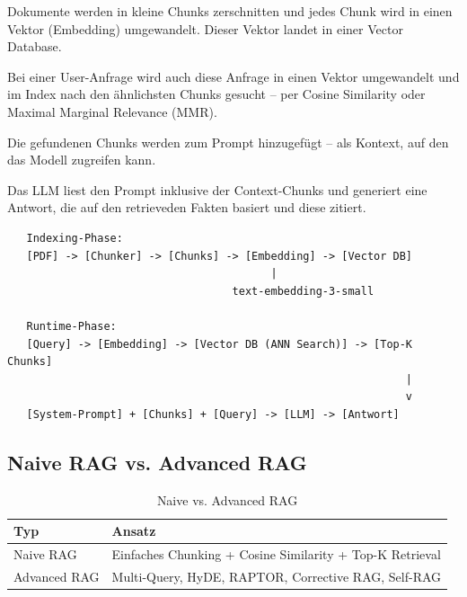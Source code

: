 \begin{description}[leftmargin=*,style=nextline]
    \item[Indexing (Indexierung):] Dokumente werden in kleine Chunks zerschnitten und jedes Chunk wird in einen Vektor (Embedding) umgewandelt. Dieser Vektor landet in einer Vector Database.
    \item[Retrieval (Abruf):] Bei einer User-Anfrage wird auch diese Anfrage in einen Vektor umgewandelt und im Index nach den ähnlichsten Chunks gesucht -- per Cosine Similarity oder Maximal Marginal Relevance (MMR).
    \item[Augmentation (Anreicherung):] Die gefundenen Chunks werden zum Prompt hinzugefügt -- als Kontext, auf den das Modell zugreifen kann.
    \item[Generation (Generierung):] Das LLM liest den Prompt inklusive der Context-Chunks und generiert eine Antwort, die auf den retrieveden Fakten basiert und diese zitiert.
\end{description}

\begin{verbatim}
   Indexing-Phase:
   [PDF] -> [Chunker] -> [Chunks] -> [Embedding] -> [Vector DB]
                                         |
                                   text-embedding-3-small
   
   Runtime-Phase:
   [Query] -> [Embedding] -> [Vector DB (ANN Search)] -> [Top-K Chunks]
                                                              |
                                                              v
   [System-Prompt] + [Chunks] + [Query] -> [LLM] -> [Antwort]
\end{verbatim}

\subsection{Naive RAG vs. Advanced RAG}

\begin{table}[H]
\centering
\begin{tabularx}{\linewidth}{lX}
\toprule
\textbf{Typ} & \textbf{Ansatz} \\
\midrule
Naive RAG & Einfaches Chunking + Cosine Similarity + Top-K Retrieval \\
Advanced RAG & Multi-Query, HyDE, RAPTOR, Corrective RAG, Self-RAG \\
\midrule
\end{tabularx}
\caption{Naive vs. Advanced RAG}
\label{tab:rag-types}
\end{table}

